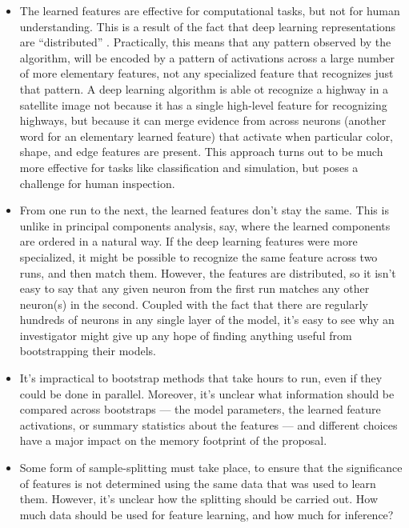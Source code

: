 \begin{itemize}
\item The learned features are effective for computational tasks, but not for
  human understanding. This is a result of the fact that deep learning
  representations are ``distributed'' \cite{mcclelland1986parallel}.
  Practically, this means that any pattern observed by the algorithm, will be
  encoded by a pattern of activations across a large number of more elementary
  features, not any specialized feature that recognizes just that pattern. A
  deep learning algorithm is able ot recognize a highway in a satellite image
  not because it has a single high-level feature for recognizing highways, but
  because it can merge evidence from across neurons (another word for an
  elementary learned feature) that activate when particular color, shape, and
  edge features are present. This approach turns out to be much more effective
  for tasks like classification and simulation, but poses a challenge for human
  inspection.
\item From one run to the next, the learned features don’t stay the same. This
  is unlike in principal components analysis, say, where the learned components
  are ordered in a natural way. If the deep learning features were more
  specialized, it might be possible to recognize the same feature across two
  runs, and then match them. However, the features are distributed, so it isn’t
  easy to say that any given neuron from the first run matches any other
  neuron(s) in the second. Coupled with the fact that there are regularly
  hundreds of neurons in any single layer of the model, it’s easy to see why an
  investigator might give up any hope of finding anything useful from
  bootstrapping their models.
\item It’s impractical to bootstrap methods that take hours to run, even if they
  could be done in parallel. Moreover, it’s unclear what information should be
  compared across bootstraps — the model parameters, the learned feature
  activations, or summary statistics about the features — and different choices
  have a major impact on the memory footprint of the proposal.
\item Some form of sample-splitting must take place, to ensure that the
  significance of features is not determined using the same data that was used
  to learn them. However, it’s unclear how the splitting should be carried out.
  How much data should be used for feature learning, and how much for inference?
\end{itemize}

